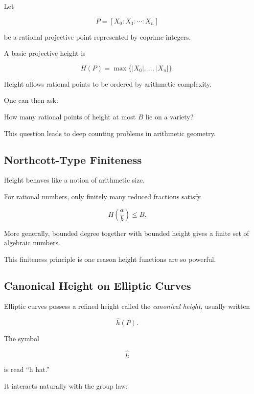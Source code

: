 Let

\[ P=[X_0:X_1:\cdots:X_n] \]

be a rational projective point represented by coprime integers.

A basic projective height is

\[ \boxed{H(P)=\max\{|X_0|,\ldots,|X_n|\}.} \]

Height allows rational points to be ordered by arithmetic complexity.

One can then ask:

\begin{center}
How many rational points of height at most \(B\) lie on a variety?
\end{center}

This question leads to deep counting problems in arithmetic geometry.

\subsection{Northcott-Type Finiteness}
\label{subsec:northcott-finiteness}

Height behaves like a notion of arithmetic size.

For rational numbers, only finitely many reduced fractions satisfy

\[ H\left(\frac ab\right)\leq B. \]

More generally, bounded degree together with bounded height gives a finite
set of algebraic numbers.

This finiteness principle is one reason height functions are so powerful.

\subsection{Canonical Height on Elliptic Curves}
\label{subsec:canonical-height-elliptic}

Elliptic curves possess a refined height called the \emph{canonical height},
usually written

\[ \hat h(P). \]

The symbol

\[ \hat h \]

is read ``h hat.''

It interacts naturally with the group law:

